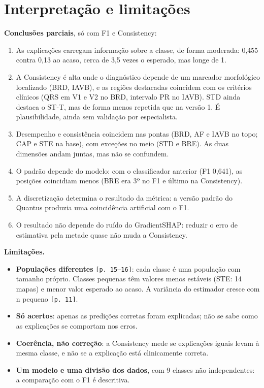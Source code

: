 \documentclass[11pt,a4paper]{article}
\begin{document}
\section{Interpretação e limitações}

\textbf{Conclusões parciais}, só com F1 e Consistency:
\begin{enumerate}
\item As explicações carregam informação sobre a classe, de forma moderada: 0,455 contra 0,13 ao acaso, cerca de 3,5 vezes o esperado, mas longe de 1.
\item A Consistency é alta onde o diagnóstico depende de um marcador morfológico localizado (BRD, IAVB), e as regiões destacadas coincidem com os critérios clínicos (QRS em V1 e V2 no BRD, intervalo PR no IAVB). STD ainda destaca o ST‑T, mas de forma menos repetida que na versão 1. É plausibilidade, ainda sem validação por especialista.
\item Desempenho e consistência coincidem nas pontas (BRD, AF e IAVB no topo; CAP e STE na base), com exceções no meio (STD e BRE). As duas dimensões andam juntas, mas não se confundem.
\item O padrão depende do modelo: com o classificador anterior (F1 0,641), as posições coincidiam menos (BRE era 3º no F1 e último na Consistency).
\item A discretização determina o resultado da métrica: a versão padrão do Quantus produzia uma coincidência artificial com o F1.
\item O resultado não depende do ruído do GradientSHAP: reduzir o erro de estimativa pela metade quase não muda a Consistency.
\end{enumerate}

\textbf{Limitações.}
\begin{itemize}
\item \textbf{Populações diferentes} \texttt{[p. 15–16]}: cada classe é uma população com tamanho próprio. Classes pequenas têm valores menos estáveis (STE: 14 mapas) e menor valor esperado ao acaso. A variância do estimador cresce com n pequeno \texttt{[p. 11]}.
\item \textbf{Só acertos}: apenas as predições corretas foram explicadas; não se sabe como as explicações se comportam nos erros.
\item \textbf{Coerência, não correção}: a Consistency mede se explicações iguais levam à mesma classe, e não se a explicação está clinicamente correta.
\item \textbf{Um modelo e uma divisão dos dados}, com 9 classes não independentes: a comparação com o F1 é descritiva.
\end{itemize}
\end{document}
